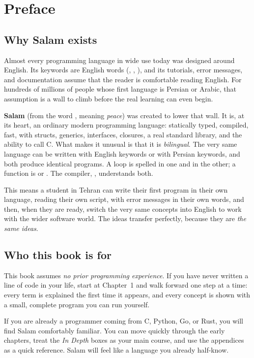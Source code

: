 \chapter*{Preface}

\section*{Why Salam exists}

Almost every programming language in wide use today was designed around
English. Its keywords are English words (, ,
), and its tutorials, error messages, and documentation assume
that the reader is comfortable reading English. For hundreds of millions of
people whose first language is Persian or Arabic, that assumption is a wall to
climb before the real learning can even begin.

\textbf{Salam} (from the word , meaning \emph{peace}) was created to
lower that wall. It is, at its heart, an ordinary modern programming language:
statically typed, compiled, fast, with structs, generics, interfaces, closures,
a real standard library, and the ability to call C. What makes it unusual is
that it is \emph{bilingual}. The very same language can be written with English
keywords or with Persian keywords, and both produce identical programs. A loop
is spelled  in one and  in the other; a function is
 or . The compiler, , understands both.

This means a student in Tehran can write their first program in their own
language, reading their own script, with error messages in their own
words, and then, when they are ready, switch the very same concepts into
English to work with the wider software world. The ideas transfer perfectly,
because they are \emph{the same ideas}.

\section*{Who this book is for}

This book assumes \emph{no prior programming experience}. If you have never
written a line of code in your life, start at Chapter~1 and walk forward one
step at a time: every term is explained the first time it appears, and every
concept is shown with a small, complete program you can run yourself.

If you are already a programmer coming from C, Python, Go, or Rust, you will
find Salam comfortably familiar. You can move quickly through the early
chapters, treat the \emph{In Depth} boxes as your main course, and use the
appendices as a quick reference. Salam will feel like a language you already
half-know.

